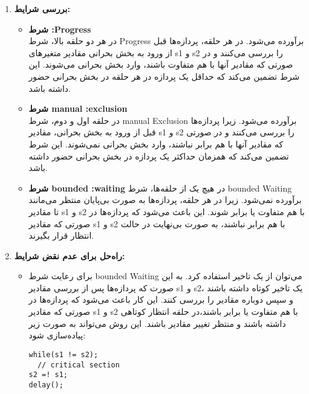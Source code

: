\begin{qsolve}
	\begin{enumerate}
		\item \textbf{بررسی شرایط:}
		\begin{itemize}
			\item \textbf{شرط :Progress\\}
در هر دو حلقه بالا، شرط Progress برآورده می‌شود. در هر حلقه، پردازه‌ها قبل از ورود به بخش بحرانی مقادیر متغیرهای s1 و s2 را بررسی می‌کنند و در صورتی که مقادیر آنها با هم متفاوت باشند، وارد بخش بحرانی می‌شوند. این شرط تضمین می‌کند که حداقل یک پردازه در هر حلقه در بخش بحرانی حضور داشته باشد.
			
			\item \textbf{شرط manual :exclusion\\}
در حلقه اول و دوم، شرط manual Exclusion برآورده می‌شود. زیرا پردازه‌ها قبل از ورود به بخش بحرانی، مقادیر s1 و s2 را بررسی می‌کنند و در صورتی که مقادیر آنها با هم برابر نباشند، وارد بخش بحرانی نمی‌شوند. این شرط تضمین می‌کند که همزمان حداکثر یک پردازه در بخش بحرانی حضور داشته باشد.
			
			
			\item \textbf{شرط bounded :waiting}
در هیچ یک از حلقه‌ها، شرط bounded Waiting برآورده نمی‌شود. زیرا در هر حلقه، پردازه‌ها به صورت بی‌پایان منتظر می‌مانند تا مقادیر s1 و s2 با هم متفاوت یا برابر شوند. این باعث می‌شود که پردازه‌ها در صورتی که مقادیر s1 و s2 با هم برابر نباشند، به صورت بی‌نهایت در حالت انتظار قرار بگیرند.
		\end{itemize}
		
		
		\item \textbf{راه‌حل برای عدم نقض شرایط:}
		\begin{itemize}
			\item برای رعایت شرط bounded Waiting می‌توان از یک تاخیر استفاده کرد. به این صورت که پردازه‌ها پس از بررسی مقادیر s1 و s2، یک تاخیر کوتاه داشته باشند و سپس دوباره مقادیر را بررسی کنند. این کار باعث می‌شود که پردازه‌ها در صورتی که مقادیر s1 و s2 با هم متفاوت یا برابر باشند،در حلقه انتظار کوتاهی داشته باشند و منتظر تغییر مقادیر باشند. این روش می‌تواند به صورت زیر پیاده‌سازی شود:
			
\begin{latin}
\begin{lstlisting}
while(s1 != s2);
  // critical section
s2 =! s1; 
delay();
\end{lstlisting}
\end{latin}
			
		\end{itemize}
	\end{enumerate}
\end{qsolve}
